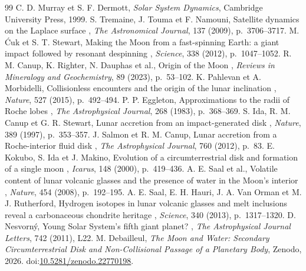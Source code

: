 \documentclass[11pt,a4paper]{article}
\begin{document}
\begin{thebibliography}{99}
 C. D. Murray et S. F. Dermott, \emph{Solar System Dynamics}, Cambridge University Press, 1999.
 S. Tremaine, J. Touma et F. Namouni, \og Satellite dynamics on the Laplace surface \fg, \emph{The Astronomical Journal}, 137 (2009), p.~3706--3717.
 M. \'{C}uk et S. T. Stewart, \og Making the Moon from a fast-spinning Earth: a giant impact followed by resonant despinning \fg, \emph{Science}, 338 (2012), p.~1047--1052.
 R. M. Canup, K. Righter, N. Dauphas et al., \og Origin of the Moon \fg, \emph{Reviews in Mineralogy and Geochemistry}, 89 (2023), p.~53--102.
 K. Pahlevan et A. Morbidelli, \og Collisionless encounters and the origin of the lunar inclination \fg, \emph{Nature}, 527 (2015), p.~492--494.
 P. P. Eggleton, \og Approximations to the radii of Roche lobes \fg, \emph{The Astrophysical Journal}, 268 (1983), p.~368--369.
 S. Ida, R. M. Canup et G. R. Stewart, \og Lunar accretion from an impact-generated disk \fg, \emph{Nature}, 389 (1997), p.~353--357.
 J. Salmon et R. M. Canup, \og Lunar accretion from a Roche-interior fluid disk \fg, \emph{The Astrophysical Journal}, 760 (2012), p.~83.
 E. Kokubo, S. Ida et J. Makino, \og Evolution of a circumterrestrial disk and formation of a single moon \fg, \emph{Icarus}, 148 (2000), p.~419--436.
 A. E. Saal et al., \og Volatile content of lunar volcanic glasses and the presence of water in the Moon's interior \fg, \emph{Nature}, 454 (2008), p.~192--195.
 A. E. Saal, E. H. Hauri, J. A. Van Orman et M. J. Rutherford, \og Hydrogen isotopes in lunar volcanic glasses and melt inclusions reveal a carbonaceous chondrite heritage \fg, \emph{Science}, 340 (2013), p.~1317--1320.
 D. Nesvorn\'y, \og Young Solar System's fifth giant planet? \fg, \emph{The Astrophysical Journal Letters}, 742 (2011), L22.
 M. Debailleul, \emph{The Moon and Water: Secondary Circumterrestrial Disk and Non-Collisional Passage of a Planetary Body}, Zenodo, 2026. doi:\href{https://doi.org/10.5281/zenodo.22770198}{10.5281/zenodo.22770198}.
\end{thebibliography}
\end{document}
